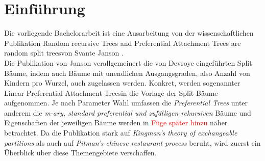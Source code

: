 \chapter*{Einführung}
Die vorliegende Bachelorarbeit ist eine Ausarbeitung von der wissenschaftlichen Publikation \glqq Random recursive Trees and Preferential Attachment Trees are random split trees\grqq von Svante Janson \cite{janson2019random}.\\
Die Publikation von Janson verallgemeinert die von Devroye \cite{devroye1998universal} eingeführten \glqq Split Bäume\grqq, indem auch Bäume mit unendlichen Ausgangsgraden, also Anzahl von Kindern pro Wurzel, auch zugelassen werden. Konkret, werden sogenannter \glqq Linear Preferential Attachment Trees\grqq in die Vorlage der Split-Bäume aufgenommen. Je nach Parameter Wahl umfassen die \textit{Preferential Trees} unter anderem die \textit{m-ary, standard preferential und zufälligen rekursiven} Bäume und Eigenschaften der jeweiligen Bäume werden in \textcolor{red}{Füge später hinzu} näher betrachtet. Da die Publikation stark auf \textit{Kingman's theory of exchangeable partitions} \cite{kingman1978representation,kingman1982coalescent} als auch auf \textit{Pitman's chinese restaurant process} \cite{pitman2006combinatorial} beruht, wird zuerst ein Überblick über diese Themengebiete verschaffen.